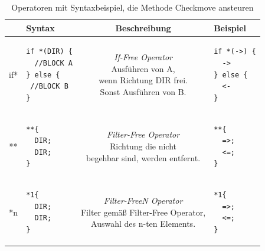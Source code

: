 \documentclass[conference]{IEEEtran}
\begin{document}
\begin{table}[!t]
\caption{Operatoren mit Syntaxbeispiel, die Methode Checkmove ansteuren}
\label{checkmove_operators_tbl}
\centering
\setlength\tabcolsep{1.5pt}
\begin{tabular}{|c||l|c|l|}
\hline
& \textbf{Syntax} & \textbf{Beschreibung} & \textbf{Beispiel}\\

\hline
if* &

\begin{lstlisting}[basicstyle=\scriptsize\ttfamily]
if *(DIR) {
  //BLOCK A
} else {
 //BLOCK B
}
\end{lstlisting} &

\makecell{\textit{If-Free Operator}\\
Ausführen von A,\\
wenn Richtung DIR frei.\\
Sonst Ausführen von B.} &

\begin{lstlisting}[basicstyle=\scriptsize\ttfamily]
if *(->) {
  ->
} else {
  <-
}
\end{lstlisting} \\

\hline
** &

\begin{lstlisting}[basicstyle=\scriptsize\ttfamily]
**{
  DIR;
  DIR;
}
\end{lstlisting} &
\makecell{\textit{Filter-Free Operator}\\
Richtung die nicht\\
begehbar sind, werden entfernt.} &

\begin{lstlisting}[basicstyle=\scriptsize\ttfamily]
**{
  =>;
  <=;
}
\end{lstlisting} \\
\hline
*n &

\begin{lstlisting}[basicstyle=\scriptsize\ttfamily]
*1{
  DIR;
  DIR;
}
\end{lstlisting} &

\makecell{\textit{Filter-FreeN Operator}\\
Filter gemäß Filter-Free Operator,\\
Auswahl des n-ten Elements.} &

\begin{lstlisting}[basicstyle=\scriptsize\ttfamily]
 *1{
  =>;
  <=;
}
\end{lstlisting} \\
\hline

\end{tabular}
\end{table}
\end{document}
